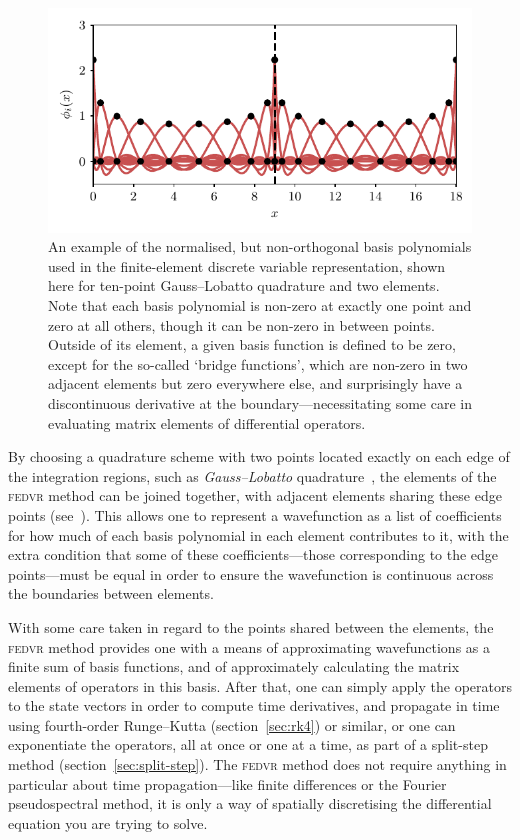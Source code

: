 \begin{figure}[t]
    \centerfloat
    \includegraphics{figures/numerics/fedvr_basis.pdf}
    \caption{An example of the normalised, but non-orthogonal basis polynomials used in the finite-element discrete variable representation, shown here for ten-point Gauss--Lobatto quadrature and two elements. Note that each basis polynomial is non-zero at exactly one point and zero at all others, though it can be non-zero in between points. Outside of its element, a given basis function is defined to be zero, except for the so-called `bridge functions', which are non-zero in two adjacent elements but zero everywhere else, and surprisingly have a discontinuous derivative at the boundary---necessitating some care in evaluating matrix elements of differential operators.}
    \label{fig:fedvr_basis}
\end{figure}

By choosing a quadrature scheme with two points located exactly on each edge of the integration regions, such as \emph{Gauss--Lobatto} quadrature~\cite{schneider_discrete_2005}, the elements of the \textsc{fedvr} method can be joined together, with adjacent elements sharing these edge points (see~). This allows one to represent a wavefunction as a list of coefficients for how much of each basis polynomial in each element contributes to it, with the extra condition that some of these coefficients---those corresponding to the edge points---must be equal in order to ensure the wavefunction is continuous across the boundaries between elements.

With some care taken in regard to the points shared between the elements, the \textsc{fedvr} method provides one with a means of approximating wavefunctions as a finite sum of basis functions, and of approximately calculating the matrix elements of operators in this basis. After that, one can simply apply the operators to the state vectors in order to compute time derivatives, and propagate in time using fourth-order Runge--Kutta (section~\ref{sec:rk4}) or similar, or one can exponentiate the operators, all at once or one at a time, as part of a split-step method (section~\ref{sec:split-step}). The \textsc{fedvr} method does not require anything in particular about time propagation---like finite differences or the Fourier pseudospectral method, it is only a way of spatially discretising the differential equation you are trying to solve.

